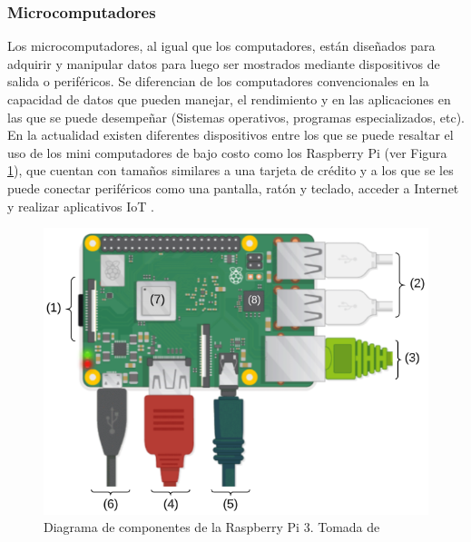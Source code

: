 \subsubsection{Microcomputadores}

Los microcomputadores, al igual que los computadores, están diseñados para adquirir y manipular datos para luego ser mostrados mediante dispositivos de salida o periféricos. Se diferencian  de los computadores convencionales en la capacidad de datos que pueden manejar, el rendimiento  y en las aplicaciones en las que se puede desempeñar (Sistemas operativos, programas especializados, etc).\\ 

En la actualidad existen diferentes dispositivos entre los que se puede resaltar el uso de los mini computadores de bajo costo como los Raspberry Pi (ver Figura \ref{raspberrypng}), que cuentan con tamaños similares a una tarjeta de crédito y a los que se les puede conectar periféricos como una pantalla, ratón y teclado, acceder a Internet y realizar aplicativos IoT \cite{defraspberry}.

\begin{figure}[H]
 \begin{center}
 \includegraphics[scale=0.75]{img/raspberry4.png}
 \end{center}
 \caption{Diagrama de componentes de la Raspberry Pi 3. Tomada de \cite{defraspberry} \label{raspberrypng}}
\end{figure}


